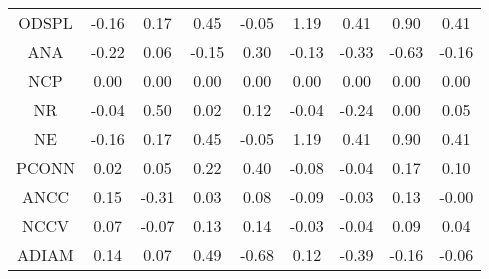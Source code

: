 \begin{longtable}{ | c || c | c | c | c | c | c | c || c |}
ODSPL &  \cellcolor[HTML]{FFF7F7} -0.16 &  \cellcolor[HTML]{F7F7FF} 0.17 &  \cellcolor[HTML]{F7F7FF} 0.45 &  \cellcolor[HTML]{FFFFFF} -0.05 &  \cellcolor[HTML]{DFDFFF} 1.19 &  \cellcolor[HTML]{F7F7FF} 0.41 &  \cellcolor[HTML]{E7E7FF} 0.90 &  \cellcolor[HTML]{F7F7FF} 0.41 \\
ANA &  \cellcolor[HTML]{FFF7F7} -0.22 &  \cellcolor[HTML]{FFFFFF} 0.06 &  \cellcolor[HTML]{FFFFFF} -0.15 &  \cellcolor[HTML]{F7F7FF} 0.30 &  \cellcolor[HTML]{FFFFFF} -0.13 &  \cellcolor[HTML]{FFF7F7} -0.33 &  \cellcolor[HTML]{FFEFEF} -0.63 &  \cellcolor[HTML]{FFFFFF} -0.16 \\
NCP &  \cellcolor[HTML]{FFFFFF} 0.00 &  \cellcolor[HTML]{FFFFFF} 0.00 &  \cellcolor[HTML]{FFFFFF} 0.00 &  \cellcolor[HTML]{FFFFFF} 0.00 &  \cellcolor[HTML]{FFFFFF} 0.00 &  \cellcolor[HTML]{FFFFFF} 0.00 &  \cellcolor[HTML]{FFFFFF} 0.00 &  \cellcolor[HTML]{FFFFFF} 0.00 \\
NR &  \cellcolor[HTML]{FFFFFF} -0.04 &  \cellcolor[HTML]{EFEFFF} 0.50 &  \cellcolor[HTML]{FFFFFF} 0.02 &  \cellcolor[HTML]{FFFFFF} 0.12 &  \cellcolor[HTML]{FFFFFF} -0.04 &  \cellcolor[HTML]{FFF7F7} -0.24 &  \cellcolor[HTML]{FFFFFF} 0.00 &  \cellcolor[HTML]{FFFFFF} 0.05 \\
NE &  \cellcolor[HTML]{FFF7F7} -0.16 &  \cellcolor[HTML]{F7F7FF} 0.17 &  \cellcolor[HTML]{F7F7FF} 0.45 &  \cellcolor[HTML]{FFFFFF} -0.05 &  \cellcolor[HTML]{DFDFFF} 1.19 &  \cellcolor[HTML]{F7F7FF} 0.41 &  \cellcolor[HTML]{E7E7FF} 0.90 &  \cellcolor[HTML]{F7F7FF} 0.41 \\
PCONN &  \cellcolor[HTML]{FFFFFF} 0.02 &  \cellcolor[HTML]{FFFFFF} 0.05 &  \cellcolor[HTML]{F7F7FF} 0.22 &  \cellcolor[HTML]{F7F7FF} 0.40 &  \cellcolor[HTML]{FFFFFF} -0.08 &  \cellcolor[HTML]{FFFFFF} -0.04 &  \cellcolor[HTML]{F7F7FF} 0.17 &  \cellcolor[HTML]{FFFFFF} 0.10 \\
ANCC &  \cellcolor[HTML]{FFFFFF} 0.15 &  \cellcolor[HTML]{FFF7F7} -0.31 &  \cellcolor[HTML]{FFFFFF} 0.03 &  \cellcolor[HTML]{FFFFFF} 0.08 &  \cellcolor[HTML]{FFFFFF} -0.09 &  \cellcolor[HTML]{FFFFFF} -0.03 &  \cellcolor[HTML]{FFFFFF} 0.13 &  \cellcolor[HTML]{FFFFFF} -0.00 \\
NCCV &  \cellcolor[HTML]{FFFFFF} 0.07 &  \cellcolor[HTML]{FFFFFF} -0.07 &  \cellcolor[HTML]{FFFFFF} 0.13 &  \cellcolor[HTML]{FFFFFF} 0.14 &  \cellcolor[HTML]{FFFFFF} -0.03 &  \cellcolor[HTML]{FFFFFF} -0.04 &  \cellcolor[HTML]{FFFFFF} 0.09 &  \cellcolor[HTML]{FFFFFF} 0.04 \\
ADIAM &  \cellcolor[HTML]{FFFFFF} 0.14 &  \cellcolor[HTML]{FFFFFF} 0.07 &  \cellcolor[HTML]{EFEFFF} 0.49 &  \cellcolor[HTML]{FFEFEF} -0.68 &  \cellcolor[HTML]{FFFFFF} 0.12 &  \cellcolor[HTML]{FFF7F7} -0.39 &  \cellcolor[HTML]{FFF7F7} -0.16 &  \cellcolor[HTML]{FFFFFF} -0.06 \\

\end{longtable}
